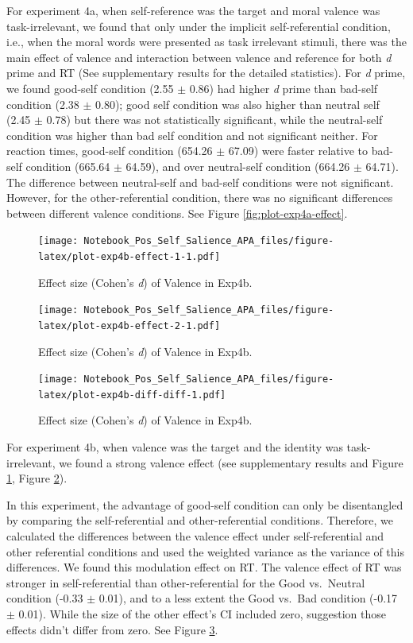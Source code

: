 \documentclass[
  english,
  man]{apa6}
\begin{document}
For experiment 4a, when self-reference was the target and moral valence was task-irrelevant, we found that only under the implicit self-referential condition, i.e., when the moral words were presented as task irrelevant stimuli, there was the main effect of valence and interaction between valence and reference for both \emph{d} prime and RT (See supplementary results for the detailed statistics). For \emph{d} prime, we found good-self condition (2.55 \(\pm\) 0.86) had higher \emph{d} prime than bad-self condition (2.38 \(\pm\) 0.80); good self condition was also higher than neutral self (2.45 \(\pm\) 0.78) but there was not statistically significant, while the neutral-self condition was higher than bad self condition and not significant neither. For reaction times, good-self condition (654.26 \(\pm\) 67.09) were faster relative to bad-self condition (665.64 \(\pm\) 64.59), and over neutral-self condition (664.26 \(\pm\) 64.71). The difference between neutral-self and bad-self conditions were not significant. However, for the other-referential condition, there was no significant differences between different valence conditions. See Figure \ref{fig:plot-exp4a-effect}.

\begin{figure}
\centering
\texttt{[image: Notebook\_Pos\_Self\_Salience\_APA\_files/figure-latex/plot-exp4b-effect-1-1.pdf]}
\caption{\label{fig:plot-exp4b-effect-1}Effect size (Cohen's \emph{d}) of Valence in Exp4b.}
\end{figure}

\begin{figure}
\centering
\texttt{[image: Notebook\_Pos\_Self\_Salience\_APA\_files/figure-latex/plot-exp4b-effect-2-1.pdf]}
\caption{\label{fig:plot-exp4b-effect-2}Effect size (Cohen's \emph{d}) of Valence in Exp4b.}
\end{figure}

\begin{figure}
\centering
\texttt{[image: Notebook\_Pos\_Self\_Salience\_APA\_files/figure-latex/plot-exp4b-diff-diff-1.pdf]}
\caption{\label{fig:plot-exp4b-diff-diff}Effect size (Cohen's \emph{d}) of Valence in Exp4b.}
\end{figure}

For experiment 4b, when valence was the target and the identity was task-irrelevant, we found a strong valence effect (see supplementary results and Figure \ref{fig:plot-exp4b-effect-1}, Figure \ref{fig:plot-exp4b-effect-2}).

In this experiment, the advantage of good-self condition can only be disentangled by comparing the self-referential and other-referential conditions. Therefore, we calculated the differences between the valence effect under self-referential and other referential conditions and used the weighted variance as the variance of this differences. We found this modulation effect on RT. The valence effect of RT was stronger in self-referential than other-referential for the Good vs.~Neutral condition (-0.33 \(\pm\) 0.01), and to a less extent the Good vs.~Bad condition (-0.17 \(\pm\) 0.01). While the size of the other effect's CI included zero, suggestion those effects didn't differ from zero. See Figure \ref{fig:plot-exp4b-diff-diff}.
\end{document}
